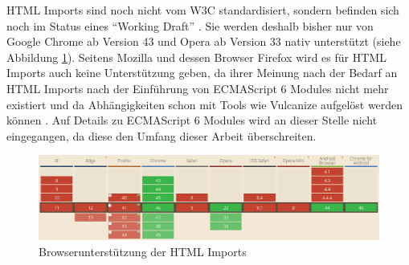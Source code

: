 \ac{HTML} Imports sind noch nicht vom \ac{W3C} standardisiert, sondern befinden sich noch im Status eines ``Working Draft'' \cite{citeulike:13853711}. Sie werden deshalb bisher nur von Google Chrome ab Version 43 und Opera ab Version 33 nativ unterstützt (siehe Abbildung \ref{fig:bdhtmli}). Seitens Mozilla und dessen Browser Firefox wird es für \ac{HTML} Imports auch keine Unterstützung geben, da ihrer Meinung nach der Bedarf an \ac{HTML} Imports nach der Einführung von ECMAScript 6 Modules nicht mehr existiert und da Abhängigkeiten schon mit Tools wie Vulcanize aufgelöst werden können \cite{citeulike:13881144}. Auf Details zu ECMAScript 6 Modules wird an dieser Stelle nicht eingegangen, da diese den Umfang dieser Arbeit überschreiten.

\begin{figure}[htbp]
 \centering
 \includegraphics[width=\linewidth]{kapitel2/bilder/5-html-imports-browserunterstuetzung}
 \caption{Browserunterstützung der HTML Imports}
 \label{fig:bdhtmli}
\end{figure}
